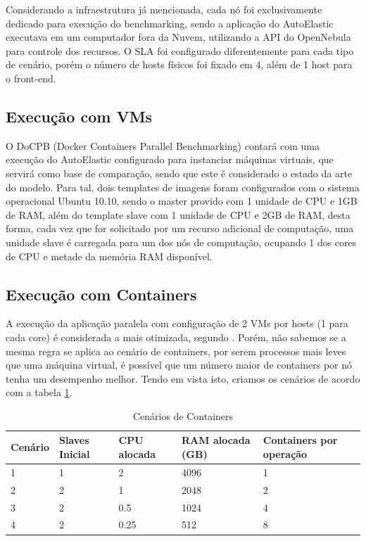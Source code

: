 \documentclass[twoside,english,brazilian]{UNISINOSartigo}
\begin{document}
Considerando a infraestrutura já mencionada, cada nó foi exclusivamente dedicado para execução do benchmarking, sendo a aplicação do AutoElastic executava em um computador fora da Nuvem, utilizando a API do OpenNebula para controle dos recursos. O SLA foi configurado diferentemente para cada tipo de cenário, porém o número de hosts físicos foi fixado em 4, além de 1 host para o front-end. 

\subsection{Execução com VMs}

O DoCPB (Docker Containers Parallel Benchmarking) contará com uma execução do AutoElastic configurado para instanciar máquinas virtuais, que servirá como base de comparação, sendo que este é considerado o estado da arte do modelo. Para tal, dois templates de imagens foram configurados com o sistema operacional Ubuntu 10.10, sendo o master provido com 1 unidade de CPU e 1GB de RAM, além do template slave com 1 unidade de CPU e 2GB de RAM, desta forma, cada vez que for solicitado por um recurso adicional de computação, uma unidade slave é carregada para um dos nós de computação, ocupando 1 dos cores de CPU e metade da memória RAM disponível.

\subsection{Execução com Containers}

A execução da aplicação paralela com configuração de 2 VMs por hosts (1 para cada core) é considerada a mais otimizada, segundo . Porém, não sabemos se a mesma regra se aplica ao cenário de containers, por serem processos mais leves que uma máquina virtual, é possível que um número maior de containers por nó tenha um desempenho melhor. Tendo em vista isto, criamos os cenários de acordo com a tabela \ref{tab:table3}.

\begin{table}[]
\centering
\caption{Cenários de Containers}
\label{tab:table3}
\begin{tabular}{|l|l|l|l|l|}
\hline
\textbf{Cenário} & \textbf{Slaves Inicial} & \textbf{CPU alocada} & \textbf{RAM alocada (GB)} & \textbf{Containers por operação} \\ \hline
1                & 1                       & 2                    & 4096                      & 1                                \\ \hline
2                & 2                       & 1                    & 2048                      & 2                                \\ \hline
3                & 2                       & 0.5                  & 1024                      & 4                                \\ \hline
4                & 2                       & 0.25                 & 512                       & 8                                \\ \hline
\end{tabular}
\end{table}
\end{document}
